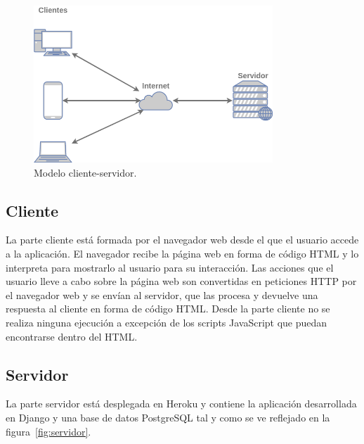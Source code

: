 \documentclass[a4paper, 12pt]{book}
\begin{document}
\begin{figure}
  \centering
  \includegraphics[width=9cm, keepaspectratio]{img/cliente-servidor.png}
  \caption{Modelo cliente-servidor.}\label{fig:cliente-servidor}
\end{figure}

\subsection{Cliente}
\label{subsec:arq_cliente}

La parte cliente está formada por el navegador web desde el que el usuario accede a la aplicación. 
El navegador recibe la página web en forma de código HTML y lo interpreta para mostrarlo al usuario para su interacción.
Las acciones que el usuario lleve a cabo sobre la página web son convertidas en peticiones HTTP por el navegador web y se envían al servidor, que las procesa y devuelve una respuesta al cliente en forma de código HTML.
Desde la parte cliente no se realiza ninguna ejecución a excepción de los scripts JavaScript que puedan encontrarse dentro del HTML.

\subsection{Servidor}
\label{subsec:arq_servidor}

La parte servidor está desplegada en Heroku y contiene la aplicación desarrollada en Django y una base de datos PostgreSQL tal y como se ve reflejado en la figura~\ref{fig:servidor}.
\end{document}
